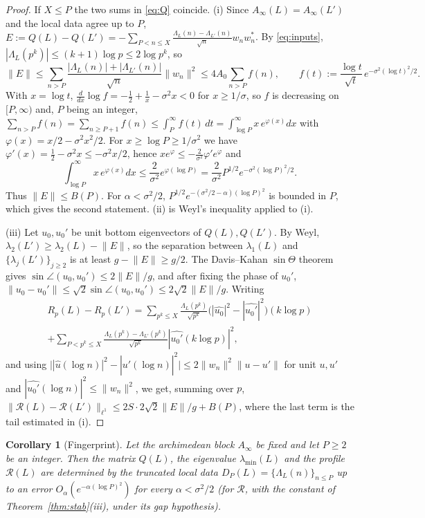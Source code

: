 \documentclass[11pt]{amsart}
\newtheorem{corollary}[theorem]{Corollary}
\theoremstyle{definition}
\theoremstyle{remark}
\newcommand{\lmin}{\lambda_{\min}}
\newcommand{\Norm}[1]{\lVert #1\rVert}
\newcommand{\Rprof}{\mathcal R}
\begin{document}
\begin{proof}
If $X\le P$ the two sums in \eqref{eq:Q} coincide. (i) Since $A_\infty(L)=A_\infty(L')$ and the local data
agree up to $P$,
$E:=Q(L)-Q(L')=-\sum_{P<n\le X}\frac{\Lambda_L(n)-\Lambda_{L'}(n)}{\sqrt n}w_nw_n^{*}$. By \eqref{eq:inputs},
$|\Lambda_L(p^k)|\le(k+1)\log p\le 2\log p^k$, so
\[
\Norm{E}\le\sum_{n>P}\frac{|\Lambda_L(n)|+|\Lambda_{L'}(n)|}{\sqrt n}\Norm{w_n}^2
\le 4A_0\sum_{n>P}f(n),\qquad f(t):=\frac{\log t}{\sqrt t}\,e^{-\sigma^2(\log t)^2/2}.
\]
With $x=\log t$, $\frac{d}{dx}\log f=-\tfrac12+\tfrac1x-\sigma^2x<0$ for $x\ge1/\sigma$, so $f$ is
decreasing on $[P,\infty)$ and, $P$ being an integer, $\sum_{n>P}f(n)=\sum_{n\ge P+1}f(n)\le\int_P^\infty f(t)\,dt=\int_{\log P}^\infty x\,e^{\varphi(x)}dx$
with $\varphi(x)=x/2-\sigma^2x^2/2$. For $x\ge\log P\ge1/\sigma^2$ we have
$\varphi'(x)=\tfrac12-\sigma^2x\le-\sigma^2x/2$, hence $x e^{\varphi}\le-\tfrac{2}{\sigma^2}\varphi'e^{\varphi}$ and
\[
\int_{\log P}^\infty x\,e^{\varphi(x)}dx\le\frac{2}{\sigma^2}e^{\varphi(\log P)}=\frac{2}{\sigma^2}P^{1/2}e^{-\sigma^2(\log P)^2/2}.
\]
Thus $\Norm E\le B(P)$. For $\alpha<\sigma^2/2$, $P^{1/2}e^{-(\sigma^2/2-\alpha)(\log P)^2}$ is bounded in $P$,
which gives the second statement. (ii) is Weyl's inequality \cite[Ch.~II]{Kato} applied to (i).

(iii) Let $u_0,u_0'$ be unit bottom eigenvectors of $Q(L),Q(L')$. By Weyl, $\lambda_2(L')\ge\lambda_2(L)-\Norm E$,
so the separation between $\lambda_1(L)$ and $\{\lambda_j(L')\}_{j\ge2}$ is at least $g-\Norm E\ge g/2$. The
Davis--Kahan $\sin\Theta$ theorem \cite{DK} gives $\sin\angle(u_0,u_0')\le 2\Norm E/g$, and after fixing the
phase of $u_0'$, $\Norm{u_0-u_0'}\le\sqrt2\sin\angle(u_0,u_0')\le 2\sqrt2\Norm E/g$. Writing
\begin{multline*}
R_p(L)-R_p(L')=\sum_{p^k\le X}\frac{\Lambda_L(p^k)}{\sqrt{p^k}}\big(|\widehat{u_0}|^2-|\widehat{u_0'}|^2\big)(k\log p)\\
+\sum_{P<p^k\le X}\frac{\Lambda_L(p^k)-\Lambda_{L'}(p^k)}{\sqrt{p^k}}|\widehat{u_0'}(k\log p)|^2,
\end{multline*}
and using $\big||\widehat u(\log n)|^2-|\widehat{u'}(\log n)|^2\big|\le 2\Norm{w_n}^2\Norm{u-u'}$ for unit
$u,u'$ and $|\widehat{u_0'}(\log n)|^2\le\Norm{w_n}^2$, we get, summing over $p$,
$\Norm{\Rprof(L)-\Rprof(L')}_{\ell^1}\le 2S\cdot 2\sqrt2\Norm E/g+B(P)$, where the last term is the tail
estimated in (i). \end{proof}

\begin{corollary}[Fingerprint]\label{cor:finger}
Let the archimedean block $A_\infty$ be fixed and let $P\ge2$ be an integer. Then the matrix $Q(L)$, the eigenvalue $\lmin(L)$ and
the profile $\Rprof(L)$ are determined by the truncated local data $D_P(L)=\{\Lambda_L(n)\}_{n\le P}$ up to an error
$O_\alpha(e^{-\alpha(\log P)^2})$ for every $\alpha<\sigma^2/2$ (for $\Rprof$, with the constant of
Theorem~\ref{thm:stab}(iii), under its gap hypothesis).
\end{corollary}
\end{document}
